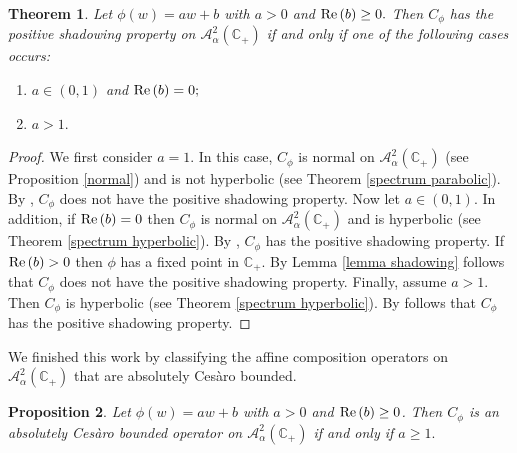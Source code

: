 \documentclass[11pt]{amsart}%
\numberwithin{equation}{section}
\theoremstyle{plain}
\newtheorem{thm}{Theorem}[section]
\newtheorem{prop}[thm]{Proposition}
\theoremstyle{definition}
\theoremstyle{definition}
\newcommand{\re}{{\rm Re}\,}
\newcommand{\hb}{\mathbb{C}_+}
\newcommand{\Ber}{\mathcal{A}^2_{\alpha}(\hb)}
\begin{document}
\begin{thm}\label{shadowing} Let $\phi(w)=a w+b$ with $a>0$ and $\re(b)\geq 0.$ Then $C_{\phi}$ has the positive shadowing property on $\Ber$ if and only if one of the following cases occurs: 
\begin{enumerate}[label=\textnormal{(\roman*)}]
\item $a\in (0,1)$ and $\re(b)=0;$
\item $a>1.$ 
\end{enumerate}
\end{thm}

\begin{proof} We first consider $a=1.$ In this case, $C_{\phi}$ is normal on $\Ber$ (see Proposition \ref{normal}) and is not hyperbolic (see Theorem \ref{spectrum parabolic}). By \cite[Theorem 30.]{Bernardes}, $C_{\phi}$ does not have the positive shadowing property. Now let $a\in (0,1).$ In addition, if $\re(b)=0$ then $C_{\phi}$ is normal on $\Ber$ and is hyperbolic (see Theorem \ref{spectrum hyperbolic}). By \cite[Theorem 30.]{Bernardes}, $C_{\phi}$ has the positive shadowing property. If $\re(b)>0$ then $\phi$ has a fixed point in $\hb.$ By Lemma \ref{lemma shadowing} follows that $C_{\phi}$ does not have the positive shadowing property. Finally, assume $a>1.$ Then $C_{\phi}$ is hyperbolic (see Theorem \ref{spectrum hyperbolic}). By \cite[Theorem 13.]{Bernardes} follows that $C_{\phi}$ has the positive shadowing property.
\end{proof}

We finished this work by classifying the affine composition operators on $\Ber$ that are absolutely Cesàro bounded.


\begin{prop}
Let $\phi(w)=a w+b$ with $a > 0$ and $\re(b) \geq 0$. Then $C_{\phi}$ is an absolutely Cesàro bounded operator on $\Ber$ if and only if $a \geq 1.$
\end{prop}
\end{document}
